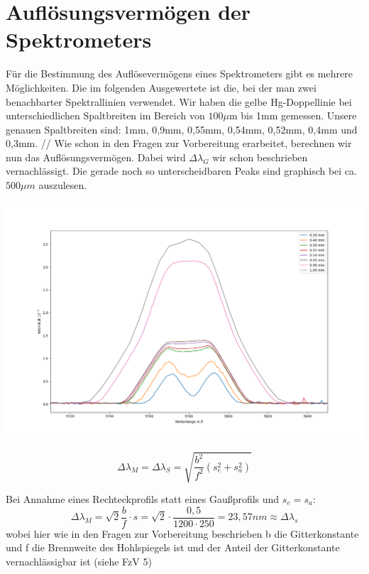 \section{Auflösungsvermögen der Spektrometers}
F\"ur die Bestimmung des Aufl\"oseverm\"ogens eines Spektrometers gibt es mehrere M\"oglichkeiten. Die im folgenden Ausgewertete ist die, bei der man zwei benachbarter 
Spektrallinien verwendet. Wir haben die gelbe Hg-Doppellinie bei unterschiedlichen Spaltbreiten im Bereich von $100\mu$m bis 1mm gemessen. 
Unsere genauen Spaltbreiten sind: 1mm, 0,9mm, 0,55mm, 0,54mm, 0,52mm, 0,4mm und 0,3mm. //
Wie schon in den Fragen zur Vorbereitung erarbeitet, berechnen wir nun das Aufl\"osungsverm\"ogen. Dabei wird $\Delta\lambda_G$ wir schon beschrieben vernachl\"assigt. 
Die gerade noch so unterscheidbaren Peaks sind graphisch bei ca. $500\mu m$ auszulesen.   \\
\begin{center}
    \includegraphics[width = \linewidth]{Bilder/6_2_3-Gelbe_Doppellinie.png}
\end{center}
\begin{equation}
\Delta\lambda_M=\Delta\lambda_S=\sqrt{\frac{b^2}{f^2}(s_e^2+s_a^2)}
\end{equation}


Bei Annahme eines Rechteckprofils statt eines Gaußprofils und $s_e=s_a$:
\begin{equation}
\Delta\lambda_M=\sqrt{2}\frac{b}{f}\cdot s = \sqrt{2}\cdot \frac{0,5}{1200\cdot 250} =23,57nm \approx \Delta\lambda_s
\end{equation}
wobei hier wie in den Fragen zur Vorbereitung beschrieben b die Gitterkonstante und f die Brennweite des Hohlspiegels ist und der Anteil der Gitterkonstante 
vernachl\"assigbar ist (siehe FzV 5)

